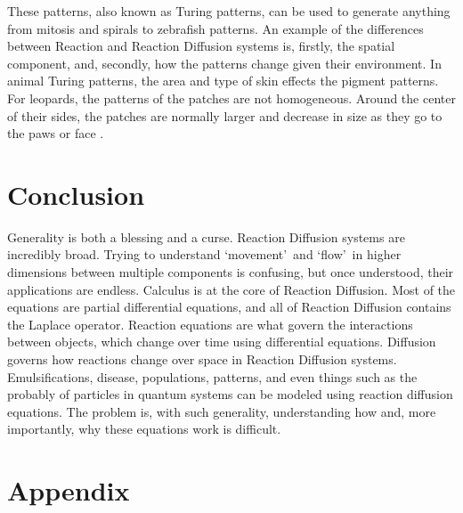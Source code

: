 \documentclass[12pt, letterpaper]{article}
\newcommand{\sorta}[1]{\lq #1\rq \,}
\begin{document}
These patterns, also known as Turing patterns, can be used to generate anything from mitosis and spirals to zebrafish patterns. An example of the
differences between Reaction and Reaction Diffusion systems is, firstly, the spatial component, and, secondly, how
the patterns change given their environment. In animal Turing patterns, the area and type of skin effects the
pigment patterns. For leopards, the patterns of the patches are not homogeneous. Around the center of their
sides, the patches are normally larger and decrease in size as they go to the paws or face 
\citep{turingsCat}.

\section{Conclusion}
Generality is both a blessing and a curse. Reaction Diffusion systems are incredibly broad.
Trying to understand \sorta{movement} and \sorta{flow} in higher dimensions between multiple components
is confusing, but once understood, their applications are endless. Calculus is at the core of Reaction
Diffusion. Most of the equations are partial differential equations, and
all of Reaction Diffusion contains the Laplace operator. Reaction equations are what govern the interactions
between objects, which change over time using differential equations. Diffusion governs how reactions
change over space in Reaction Diffusion systems. Emulsifications, disease, populations,
patterns, and even things such as the probably of particles in quantum systems can be modeled using reaction
diffusion equations. The problem is, with such generality, understanding how and, more
importantly, why these equations work is difficult.

\newpage


\newpage
\section{Appendix}

\listoffigures










\end{document}
